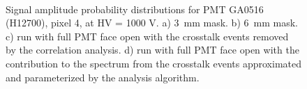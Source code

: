 \begin{figure}[hbt] 
\centering 
   \\
  \caption{Signal amplitude probability distributions for PMT GA0516 (H12700), pixel 4, at HV = 1000 V. a) 3~mm mask. b) 6~mm mask. c) run with full PMT face open with the crosstalk events removed by the correlation analysis. d) run with full PMT face open with the contribution to the spectrum from the crosstalk events approximated and parameterized by the analysis algorithm.
    }
\label{fig:GA0516_1}
\end{figure}
